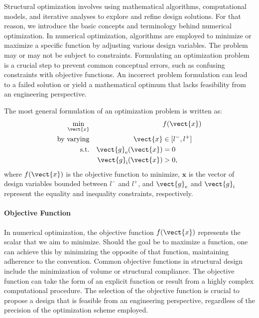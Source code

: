 Structural optimization involves using mathematical algorithms, computational models, and iterative analyses to explore and refine design solutions. For that reason, we introduce the basic concepts and terminology behind numerical optimization. In numerical optimization, algorithms are employed to minimize or maximize a specific function by adjusting various design variables. The problem may or may not be subject to constraints. Formulating an optimization problem is a crucial step to prevent common conceptual errors, such as confusing constraints with objective functions. An incorrect problem formulation can lead to a failed solution or yield a mathematical optimum that lacks feasibility from an engineering perspective.

The most general formulation of an optimization problem is written as:
\begin{equation}
    \begin{aligned}
    \min_{\vect{x}}         && & f(\vect{x})\\
    \textrm{by varying}   && \vect{x} &\in [l^-,l^+] \\
    \textrm{s.t.}   && \vect{g}_\text{e}(\vect{x}) &= 0 \\
    && \vect{g}_\text{i}(\vect{x}) &> 0, \\
    \end{aligned}
\end{equation}
where $ f(\vect{x}) $ is the objective function to minimize, $ \bm{x} $ is the vector of design variables bounded between $ l^- $ and $ l^+ $, and $\vect{g}_\text{e}$ and $\vect{g}_\text{i}$ represent the equality and inequality constraints, respectively.

\paragraph{Objective Function}
In numerical optimization, the objective function $f(\vect{x})$ represents the scalar that we aim to minimize. Should the goal be to maximize a function, one can achieve this by minimizing the opposite of that function, maintaining adherence to the convention. Common objective functions in structural design include the minimization of volume or structural compliance. The objective function can take the form of an explicit function or result from a highly complex computational procedure. The selection of the objective function is crucial to propose a design that is feasible from an engineering perspective, regardless of the precision of the optimization scheme employed.

